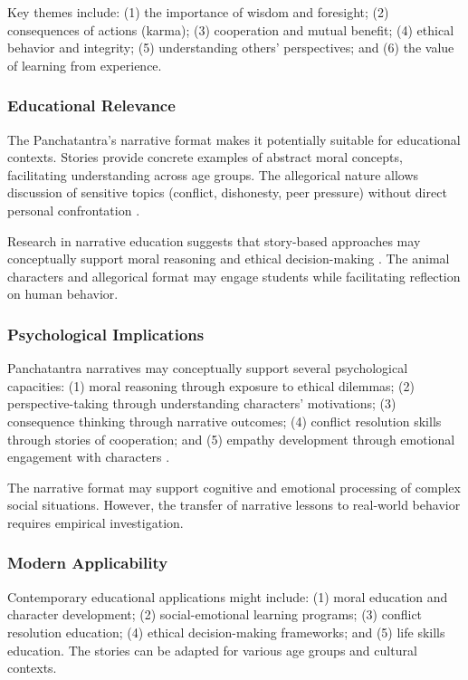 \documentclass[12pt,a4paper,twocolumn]{article}
\begin{document}
Key themes include: (1) the importance of wisdom and foresight; (2) consequences of actions (karma); (3) cooperation and mutual benefit; (4) ethical behavior and integrity; (5) understanding others' perspectives; and (6) the value of learning from experience.

\subsubsection{Educational Relevance}

The Panchatantra's narrative format makes it potentially suitable for educational contexts. Stories provide concrete examples of abstract moral concepts, facilitating understanding across age groups. The allegorical nature allows discussion of sensitive topics (conflict, dishonesty, peer pressure) without direct personal confrontation \citep{Mishra2017}.

Research in narrative education suggests that story-based approaches may conceptually support moral reasoning and ethical decision-making \citep{Joshi2021}. The animal characters and allegorical format may engage students while facilitating reflection on human behavior.

\subsubsection{Psychological Implications}

Panchatantra narratives may conceptually support several psychological capacities: (1) moral reasoning through exposure to ethical dilemmas; (2) perspective-taking through understanding characters' motivations; (3) consequence thinking through narrative outcomes; (4) conflict resolution skills through stories of cooperation; and (5) empathy development through emotional engagement with characters \citep{Mishra2017}.

The narrative format may support cognitive and emotional processing of complex social situations. However, the transfer of narrative lessons to real-world behavior requires empirical investigation.

\subsubsection{Modern Applicability}

Contemporary educational applications might include: (1) moral education and character development; (2) social-emotional learning programs; (3) conflict resolution education; (4) ethical decision-making frameworks; and (5) life skills education. The stories can be adapted for various age groups and cultural contexts.
\end{document}
